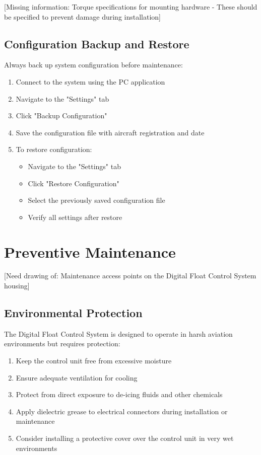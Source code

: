 \documentclass[12pt,a4paper,twoside,openright]{book}
\begin{document}
{\color{missingred}[Missing information: Torque specifications for mounting hardware - These should be specified to prevent damage during installation]}

\subsection{Configuration Backup and Restore}

Always back up system configuration before maintenance:

\begin{enumerate}
    \item Connect to the system using the PC application
    \item Navigate to the "Settings" tab
    \item Click "Backup Configuration"
    \item Save the configuration file with aircraft registration and date
    \item To restore configuration:
    \begin{itemize}
        \item Navigate to the "Settings" tab
        \item Click "Restore Configuration"
        \item Select the previously saved configuration file
        \item Verify all settings after restore
    \end{itemize}
\end{enumerate}

\section{Preventive Maintenance}

{\color{missingred}[Need drawing of: Maintenance access points on the Digital Float Control System housing]}

\subsection{Environmental Protection}

The Digital Float Control System is designed to operate in harsh aviation environments but requires protection:

\begin{enumerate}
    \item Keep the control unit free from excessive moisture
    \item Ensure adequate ventilation for cooling
    \item Protect from direct exposure to de-icing fluids and other chemicals
    \item Apply dielectric grease to electrical connectors during installation or maintenance
    \item Consider installing a protective cover over the control unit in very wet environments
\end{enumerate}
\end{document}
